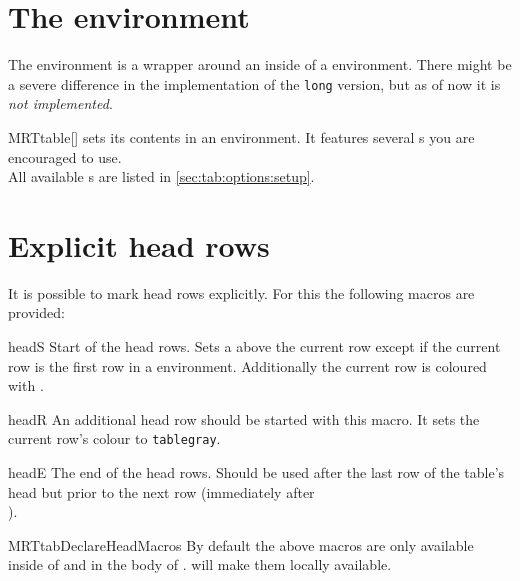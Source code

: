 \section{The  environment}\label{sec:tab:table}%
The  environment is a wrapper around an  inside of
a  environment. There might be a severe difference in the
implementation of the \texttt{long} version, but as of now it is \emph{not
implemented}.

\begin{describeenv}{MRTtable}[]
   sets its contents in an  environment. It
  features several s you are encouraged to use.
  \\[\parskip]
  All available s are listed in \autoref{sec:tab:options:setup}.
\end{describeenv}

\section{Explicit head rows}\label{sec:tab:explicit}%
It is possible to mark head rows explicitly. For this the following macros are
provided:

\begin{describemacro}{headS}%
  Start of the head rows. Sets a  above the current row except if the
  current row is the first row in a  environment. Additionally
  the current row is coloured with .
\end{describemacro}%

\begin{describemacro}{headR}%
  An additional head row should be started with this macro. It sets the current
  row's colour to \texttt{tablegray}.
\end{describemacro}%

\begin{describemacro}{headE}%
  The end of the head rows. Should be used after the last row of the table's
  head but prior to the next row (immediately after \texttt{\string\\}).
\end{describemacro}%

\begin{describemacro}{MRTtabDeclareHeadMacros}%
  By default the above macros are only available inside of  and
  in the body of .  will make them
  locally available.
\end{describemacro}%

